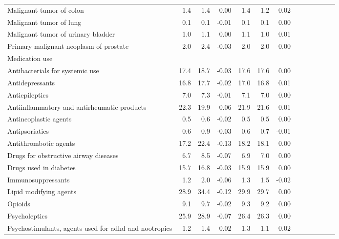 \documentclass[11pt,]{article}
\begin{document}
\begin{longtable}{lrrrrrrrrrrrr}
      Malignant tumor of colon &  1.4 &  1.4 &  0.00 &  1.4 &  1.2 &  0.02 \\ 
      Malignant tumor of lung &  0.1 &  0.1 & -0.01 &  0.1 &  0.1 &  0.00 \\ 
      Malignant tumor of urinary bladder &  1.0 &  1.1 &  0.00 &  1.1 &  1.0 &  0.01 \\ 
      Primary malignant neoplasm of prostate &  2.0 &  2.4 & -0.03 &  2.0 &  2.0 &  0.00 \\ 
  Medication use &    &    &     &    &    &     \\ 
      Antibacterials for systemic use & 17.4 & 18.7 & -0.03 & 17.6 & 17.6 &  0.00 \\ 
      Antidepressants & 16.8 & 17.7 & -0.02 & 17.0 & 16.8 &  0.01 \\ 
      Antiepileptics &  7.0 &  7.3 & -0.01 &  7.1 &  7.0 &  0.00 \\ 
      Antiinflammatory and antirheumatic products & 22.3 & 19.9 &  0.06 & 21.9 & 21.6 &  0.01 \\ 
      Antineoplastic agents &  0.5 &  0.6 & -0.02 &  0.5 &  0.5 &  0.00 \\ 
      Antipsoriatics &  0.6 &  0.9 & -0.03 &  0.6 &  0.7 & -0.01 \\ 
      Antithrombotic agents & 17.2 & 22.4 & -0.13 & 18.2 & 18.1 &  0.00 \\ 
      Drugs for obstructive airway diseases &  6.7 &  8.5 & -0.07 &  6.9 &  7.0 &  0.00 \\ 
      Drugs used in diabetes & 15.7 & 16.8 & -0.03 & 15.9 & 15.9 &  0.00 \\ 
      Immunosuppressants &  1.2 &  2.0 & -0.06 &  1.3 &  1.5 & -0.02 \\ 
      Lipid modifying agents & 28.9 & 34.4 & -0.12 & 29.9 & 29.7 &  0.00 \\ 
      Opioids &  9.1 &  9.7 & -0.02 &  9.3 &  9.2 &  0.00 \\ 
      Psycholeptics & 25.9 & 28.9 & -0.07 & 26.4 & 26.3 &  0.00 \\ 
      Psychostimulants, agents used for adhd and nootropics &  1.2 &  1.4 & -0.02 &  1.3 &  1.1 &  0.02 \\ 
   \bottomrule\end{longtable}
\clearpage
{}
\end{document}
